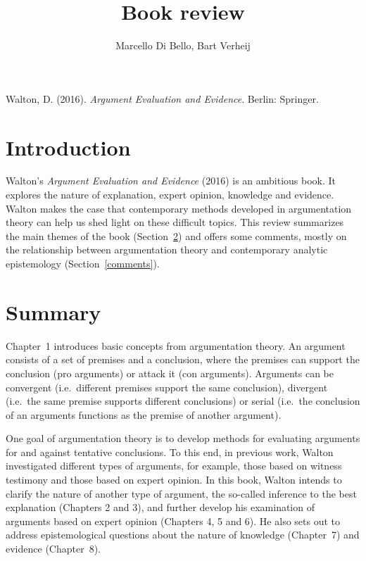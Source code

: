 \documentclass[12pt,a4paper]{article}
\begin{document}
\title{Book review}

\author{Marcello Di Bello, Bart Verheij}

\date{}

\maketitle


Walton, D. (2016). \emph{Argument Evaluation and Evidence}. Berlin: Springer.

\section{Introduction}

\noindent Walton's \emph{Argument Evaluation and Evidence} (2016) is an ambitious book. It explores the nature of explanation,
expert opinion, knowledge and evidence. Walton makes the case that
contemporary methods developed in argumentation theory can help us shed light on these difficult topics.
This review summarizes the main themes of the book (Section~\ref{summary}) and offers some comments, 
mostly on the relationship between argumentation theory and contemporary analytic epistemology (Section~\ref{comments}).

\section{Summary}
\label{summary}
\noindent Chapter~1 introduces basic concepts from argumentation
theory. An argument consists of a set of premises and a conclusion,
where the premises can support the conclusion (pro arguments) or attack
it (con arguments). Arguments can be convergent (i.e.\ different
premises support the same conclusion), divergent (i.e.\ the same
premise supports different conclusions) or serial (i.e.\ the conclusion
of an arguments functions as the premise of another argument).

One goal of argumentation theory is to develop methods for evaluating 
arguments for and against tentative conclusions. To this end, in previous work,
Walton investigated different types of arguments, for example, those
based on witness testimony and those based on expert opinion. In this
book, Walton intends to clarify the nature of another type of
argument, the so-called inference to the best explanation (Chapters 2
and 3), and further develop his examination of arguments based on
expert opinion (Chapters 4, 5 and  6). He also sets out to
address epistemological questions about the nature of knowledge
(Chapter~7) and evidence (Chapter~8).
\end{document}
